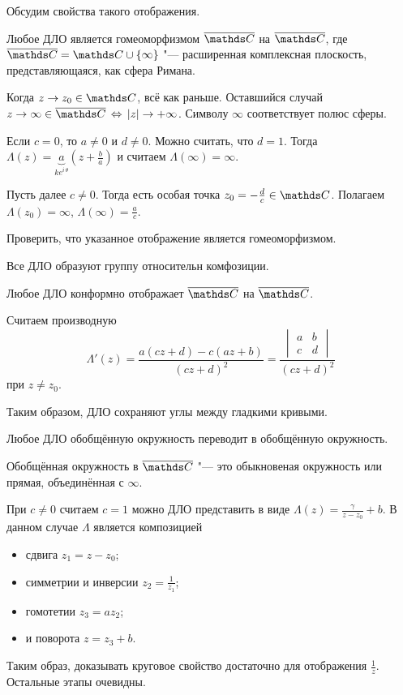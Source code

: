 Обсудим свойства такого отображения.
\begin{Ut}
	Любое ДЛО является гомеоморфизмом $\ol{\C}$ на $\ol{\C}$, где $\ol{\C} = \C\cup\{\infty\}$ "--- расширенная комплексная плоскость, представляющаяся, как сфера Римана.
\end{Ut}
Когда $z\to z_0\in\C$, всё как раньше. Оставшийся случай $z\to\infty\in\ol\C\iff |z|\to+\infty$. Символу $\infty$ соответствует полюс сферы.

Если $c=0$, то $a\ne 0$ и $d\ne0$. Можно считать, что $d=1$. Тогда $\Lambda(z) = \underbrace{a}_{k e^{i\,\theta}}\left(z + \frac ba\right)$ и считаем $\Lambda(\infty) = \infty$.

Пусть далее $c\ne0$. Тогда есть особая точка $z_0 = -\frac dc\in\C$. Полагаем $\Lambda(z_0)=\infty$, $\Lambda(\infty) = \frac ac$.
\begin{Task}
	Проверить, что указанное отображение является гомеоморфизмом.
\end{Task}
\begin{Ut}
	Все ДЛО образуют группу относительн комфозиции.
\end{Ut}
\begin{Ut}
	Любое ДЛО конформно отображает $\ol\C$ на $\ol\C$.
\end{Ut}
\begin{Proof}
	Считаем производную
	\[
		\Lambda'(z) = \frac{a(cz + d) - c(az+b)}{(cz+d)^2} = \frac{\begin{vmatrix}
			a & b\\ c& d
		\end{vmatrix}}{(cz + d)^2}
	\] при $z\ne z_0$.
\end{Proof}
Таким образом, ДЛО сохраняют углы между гладкими кривыми.
\begin{Ut}
	Любое ДЛО обобщённую окружность переводит в обобщённую окружность.
\end{Ut}
Обобщённая окружность в $\ol\C$ "--- это обыкновеная окружность или прямая, объединённая с $\infty$.

При $c\ne 0$ считаем $c=1$ можно ДЛО представить в виде $\Lambda(z) = \frac{\gamma}{z-z_0} + b$. В данном случае $\Lambda$ является композицией
\begin{itemize}
	\item сдвига $z_1 = z - z_0$;
	\item симметрии и инверсии $z_2 = \frac1{z_1}$;
	\item гомотетии $z_3 = a z_2$;
	\item и поворота $z = z_3 + b$.
\end{itemize}
Таким образ, доказывать круговое свойство достаточно для отображения $\frac1z$. Остальные этапы очевидны.
